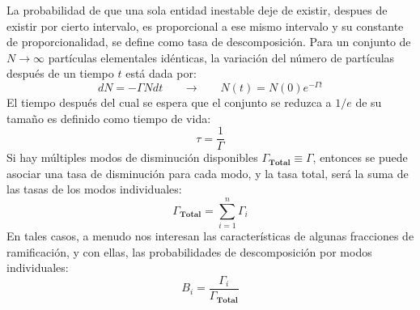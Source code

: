 La probabilidad de que una sola entidad inestable deje de existir, despues de existir por cierto intervalo, es proporcional a ese mismo intervalo y su constante de proporcionalidad, se define como tasa de descomposición. Para un conjunto de $N\rightarrow \infty$ partículas elementales idénticas, la variación del número de partículas después de un tiempo $t$ está dada por:
\begin{equation}
dN = -\Gamma N dt ~~~~~~~~\rightarrow ~~~~~~~~ N(t)=N(0) e^{-\Gamma t}
\end{equation}
El tiempo después del cual se espera que el conjunto se reduzca a $1/e$ de su tamaño es definido como tiempo de vida:
\begin{equation}
\tau = \dfrac{1}{\Gamma}
\end{equation}
Si hay múltiples modos de disminución disponibles $\Gamma_\mathbf{Total} \equiv \Gamma$, entonces se puede asociar una tasa de disminución para cada modo, y la tasa total, será la suma de las tasas de los modos individuales:
\begin{equation}
\Gamma_\mathbf{Total} = \sum_{i=1}^{n} \Gamma_i
\end{equation}
En tales casos, a menudo nos interesan las características de algunas fracciones de ramificación, y con ellas, las probabilidades de descomposición por modos individuales:
\begin{equation}
B_i = \dfrac{\Gamma_i}{\Gamma_\mathbf{Total}}
\end{equation}

